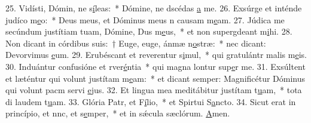 25. Vidísti, Dómin, ne s\uline{í}leas:~* Dómine, ne dscédas \uline{a} me.
26. Exsúrge et inténde judíco m\uline{e}o:~* Deus meus, et Dóminus meus n causam m\uline{e}am.
27. Júdica me secúndum justítiam tuam, Dómine, Dus m\uline{e}us,~* et non supergdeant m\uline{i}hi.
28. Non dicant in córdibus suis:~† Euge, euge, ánmæ n\uline{o}stræ:~* nec dicant: Devorvimus \uline{e}um.
29. Erubéscant et reverentur s\uline{i}mul,~* qui gratulántr malis m\uline{e}is.
30. Induántur confusióne et rver\uline{é}ntia~* qui magna lontur sup\uline{e}r me.
31. Exsúltent et læténtur qui volunt justítam m\uline{e}am:~* et dicant semper: Magnificétur Dóminus qui volunt pacm servi \uline{e}jus.
32. Et lingua mea meditábitur justítam t\uline{u}am,~* tota di laudem t\uline{u}am.
33. Glória Patr, et F\uline{í}lio,~* et Spirtui S\uline{a}ncto.
34. Sicut erat in princípio, et nnc, et s\uline{e}mper,~* et in sǽcula sæclórum. \uline{A}men.
